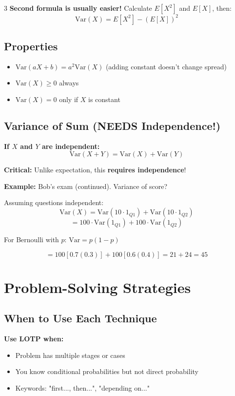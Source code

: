 \documentclass[10pt,landscape]{article}
\begin{document}
\begin{multicols}{3}
\textbf{Second formula is usually easier!} Calculate $E[X^2]$ and $E[X]$, then:
$$\text{Var}(X) = E[X^2] - (E[X])^2$$

\subsection{Properties}
\begin{itemize}[leftmargin=*,noitemsep,topsep=0pt]
\item $\text{Var}(aX + b) = a^2 \text{Var}(X)$ (adding constant doesn't change spread)
\item $\text{Var}(X) \geq 0$ always
\item $\text{Var}(X) = 0$ only if $X$ is constant
\end{itemize}

\subsection{Variance of Sum (NEEDS Independence!)}
\textbf{If $X$ and $Y$ are independent:}
$$\text{Var}(X + Y) = \text{Var}(X) + \text{Var}(Y)$$

\textbf{Critical:} Unlike expectation, this \textbf{requires independence}!

\textbf{Example:} Bob's exam (continued). Variance of score?

Assuming questions independent:
$$\text{Var}(X) = \text{Var}(10 \cdot 1_{Q1}) + \text{Var}(10 \cdot 1_{Q2})$$
$$= 100 \cdot \text{Var}(1_{Q1}) + 100 \cdot \text{Var}(1_{Q2})$$

For Bernoulli with $p$: $\text{Var} = p(1-p)$

$$= 100[0.7(0.3)] + 100[0.6(0.4)] = 21 + 24 = 45$$

\section{Problem-Solving Strategies}

\subsection{When to Use Each Technique}

\textbf{Use LOTP when:}
\begin{itemize}[leftmargin=*,noitemsep,topsep=0pt]
\item Problem has multiple stages or cases
\item You know conditional probabilities but not direct probability
\item Keywords: "first..., then...", "depending on..."
\end{itemize}


\end{multicols}
\end{document}

